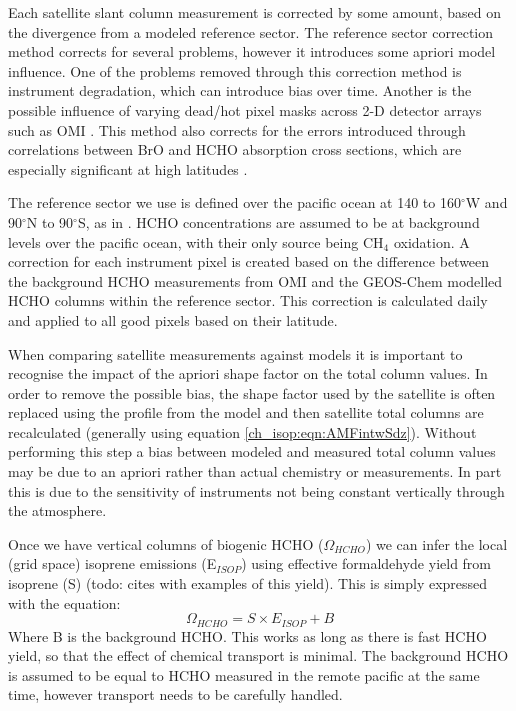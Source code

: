     Each satellite slant column measurement is corrected by some amount, based on the divergence from a modeled reference sector.
    The reference sector correction method corrects for several problems, however it introduces some apriori model influence.
    One of the problems removed through this correction method is instrument degradation, which can introduce bias over time.
    Another is the possible influence of varying dead/hot pixel masks across 2-D detector arrays such as OMI \citep{DeSmedt2015}.
    This method also corrects for the errors introduced through correlations between BrO and HCHO absorption cross sections, which are especially significant at high latitudes \citep{Gonzalez2015}.
    
    The reference sector we use is defined over the pacific ocean at 140 to 160$^{\circ}$W and 90$^{\circ}$N to 90$^{\circ}$S, as in \citet{Gonzalez2015}.
    HCHO concentrations are assumed to be at background levels over the pacific ocean, with their only source being CH$_4$ oxidation.
    A correction for each instrument pixel is created based on the difference between the background HCHO measurements from OMI and the GEOS-Chem modelled HCHO columns within the reference sector.
    This correction is calculated daily and applied to all good pixels based on their latitude.
    
    
    When comparing satellite measurements against models it is important to recognise the impact of the apriori shape factor on the total column values.
    In order to remove the possible bias, the shape factor used by the satellite is often replaced using the profile from the model and then satellite total columns are recalculated (generally using equation \ref{ch_isop:eqn:AMFintwSdz}).
    Without performing this step a bias between modeled and measured total column values may be due to an apriori rather than actual chemistry or measurements.
    In part this is due to the sensitivity of instruments not being constant vertically through the atmosphere.
    
    Once we have vertical columns of biogenic HCHO ($\Omega_{HCHO}$) we can infer the local (grid space) isoprene emissions (E$_{ISOP}$) using effective formaldehyde yield from isoprene (S) (todo: cites with examples of this yield).
    This is simply expressed with the equation:
    \begin{equation} \label{ch_isop:eqn:isop_yield}
      \Omega_{HCHO} = S \times E_{ISOP} + B
    \end{equation}
    Where B is the background HCHO.
    This works as long as there is fast HCHO yield, so that the effect of chemical transport is minimal.
    The background HCHO is assumed to be equal to HCHO measured in the remote pacific at the same time, however transport needs to be carefully handled.
    
